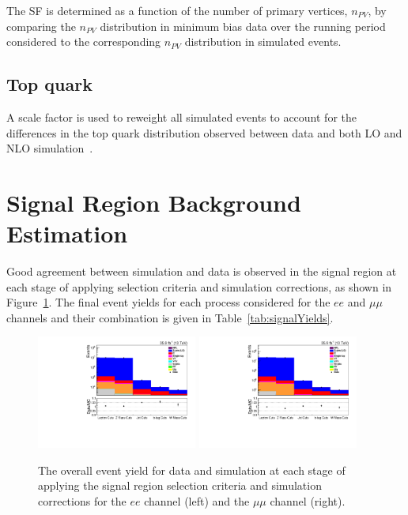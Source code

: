 The \PU SF is determined as a function of the number of primary vertices, $n_{PV}$, by comparing the $n_{PV}$ distribution in minimum bias data over the running period considered to the corresponding $n_{PV}$ distribution in simulated events.

\subsection{Top quark \pt}
A scale factor is used to reweight all simulated \ttbar events to account for the differences in the top quark \pt distribution observed between data and both LO and NLO simulation~\cite{Khachatryan:2015oqa}.

\section{Signal Region Background Estimation}\label{sec:simBackgrounds}

Good agreement between simulation and data is observed in the signal region at each stage of applying selection criteria and simulation corrections, as shown in Figure~\ref{fig:SR_cutFlow}.
The final event yields for each process considered for the $ee$ and $\mu\mu$ channels and their combination is given in Table~\ref{tab:signalYields}.

\begin{figure}[h]
\centering
\includegraphics[width=0.47\textwidth]{figs/background-estimation/plots/unblinded/prompt_ee_ttbarInc/cutFlow_log.pdf}
\includegraphics[width=0.47\textwidth]{figs/background-estimation/plots/unblinded/prompt_mumu_ttbarInc/cutFlow_log.pdf}
\caption{
The overall event yield for data and simulation at each stage of applying the signal region selection criteria and simulation corrections for the $ee$ channel (left) and the $\mu\mu$ channel (right).
}
\label{fig:SR_cutFlow}
\end{figure}

